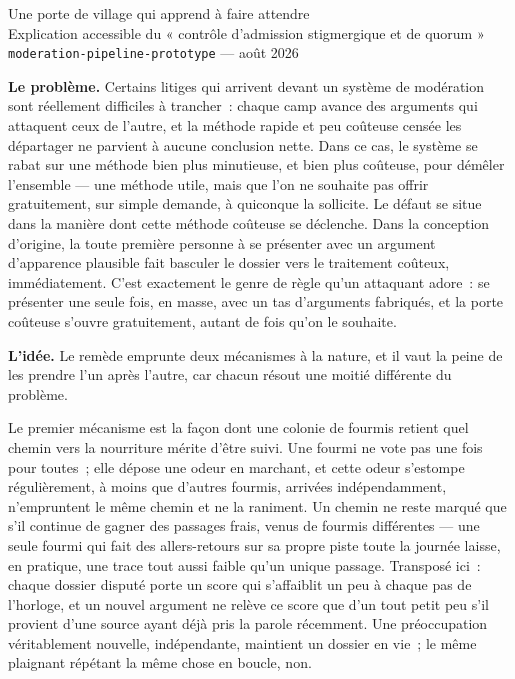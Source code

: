 \documentclass[11pt]{article}
\begin{document}
\begin{center}
{\LARGE Une porte de village qui apprend à faire attendre}\\[0.6em]
{\large Explication accessible du « contrôle d'admission stigmergique et
  de quorum »}\\[0.3em]
{\small \texttt{moderation-pipeline-prototype} --- août 2026}
\end{center}

\vspace{1em}

\textbf{Le problème.} Certains litiges qui arrivent devant un système de
modération sont réellement difficiles à trancher~: chaque camp avance des
arguments qui attaquent ceux de l'autre, et la méthode rapide et peu
coûteuse censée les départager ne parvient à aucune conclusion nette.
Dans ce cas, le système se rabat sur une méthode bien plus minutieuse,
et bien plus coûteuse, pour démêler l'ensemble --- une méthode utile,
mais que l'on ne souhaite pas offrir gratuitement, sur simple demande, à
quiconque la sollicite. Le défaut se situe dans la manière dont cette
méthode coûteuse se déclenche. Dans la conception d'origine, la toute
première personne à se présenter avec un argument d'apparence plausible
fait basculer le dossier vers le traitement coûteux, immédiatement.
C'est exactement le genre de règle qu'un attaquant adore~: se présenter
une seule fois, en masse, avec un tas d'arguments fabriqués, et la porte
coûteuse s'ouvre gratuitement, autant de fois qu'on le souhaite.

\textbf{L'idée.} Le remède emprunte deux mécanismes à la nature, et il
vaut la peine de les prendre l'un après l'autre, car chacun résout une
moitié différente du problème.

Le premier mécanisme est la façon dont une colonie de fourmis retient
quel chemin vers la nourriture mérite d'être suivi. Une fourmi ne vote
pas une fois pour toutes~; elle dépose une odeur en marchant, et cette
odeur s'estompe régulièrement, à moins que d'autres fourmis, arrivées
indépendamment, n'empruntent le même chemin et ne la raniment. Un chemin
ne reste marqué que s'il continue de gagner des passages frais, venus de
fourmis différentes --- une seule fourmi qui fait des allers-retours sur
sa propre piste toute la journée laisse, en pratique, une trace tout
aussi faible qu'un unique passage. Transposé ici~: chaque dossier
disputé porte un score qui s'affaiblit un peu à chaque pas de l'horloge,
et un nouvel argument ne relève ce score que d'un tout petit peu s'il
provient d'une source ayant déjà pris la parole récemment. Une
préoccupation véritablement nouvelle, indépendante, maintient un dossier
en vie~; le même plaignant répétant la même chose en boucle, non.
\end{document}
